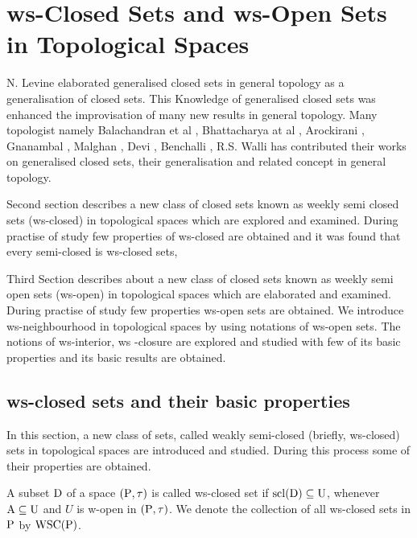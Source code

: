 \chapter{ws-Closed Sets and ws-Open Sets in Topological Spaces}
\graphicspath{{Chapter2/Chapter2Figs/EPS/}{Chapter2/Chapter2Figs/}}

N. Levine \cite{Levine} elaborated generalised closed sets in general topology as a generalisation of closed sets. This Knowledge of generalised closed sets was enhanced the improvisation of many new results in general topology. Many topologist namely Balachandran et al \cite{Balachandran}, Bhattacharya at al \cite{Bhattacharya}, Arockirani \cite{Arockiarani}, Gnanambal \cite{Gnanambal}, Malghan \cite{Malghan}, Devi \cite{Devi}, Benchalli \cite{Benchalli}, R.S. Walli \cite{Wali2} has contributed their works on generalised closed sets, their generalisation and related concept in general topology.

Second section describes a new class of closed sets known as weekly semi closed sets (ws-closed) in topological spaces which are explored and examined. During practise of study few properties of ws-closed are obtained and it was found that every semi-closed is ws-closed sets,

Third Section describes about a new class of closed sets known as weekly semi open sets (ws-open) in topological spaces which are elaborated and examined. During practise of study few properties ws-open sets are obtained. We introduce ws-neighbourhood in topological spaces by using notations of ws-open sets. The notions of ws-interior, ws -closure are explored and studied with few of its basic properties and its basic results are obtained.

\section{ws-closed sets and their basic properties}\label{sec}

In this section, a new class of sets, called weakly semi-closed (briefly, ws-closed) sets in topological spaces are introduced and studied. During this process some of their properties are obtained.

\begin{dfn}\label{defi2.2.1}
A subset $\mathrm{D}$ of a space $(\mathrm{P},\tau)$ is called ws-closed set if $\mathrm{scl}(\mathrm{D}) \subseteq \mathrm{U}$, whenever $\mathrm{A} \subseteq \mathrm{U}$ and $U$ is w-open in $(\mathrm{P},\tau)$. We denote the collection of all ws-closed sets in $\mathrm{P}$ by $\mbox{WSC}(\mathrm{P})$.
\end{dfn}

